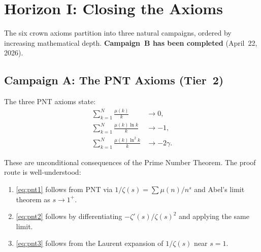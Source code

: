 \documentclass[11pt,a4paper]{article}
\begin{document}
\section{Horizon I: Closing the Axioms}
\label{sec:axioms}

The six crown axioms partition into three natural campaigns, ordered
by increasing mathematical depth. \textbf{Campaign~B has been completed}
(April~22, 2026).

\subsection{Campaign A: The PNT Axioms (Tier~2)}

\begin{axiombox}
\label{ax:pnt}
The three PNT axioms state:
\begin{align}
  \sum_{k=1}^{N} \frac{\mu(k)}{k} &\to 0, \label{eq:pnt1} \\
  \sum_{k=1}^{N} \frac{\mu(k)\ln k}{k} &\to -1, \label{eq:pnt2} \\
  \sum_{k=1}^{N} \frac{\mu(k)\ln^2 k}{k} &\to -2\gamma. \label{eq:pnt3}
\end{align}
\end{axiombox}

These are unconditional consequences of the Prime Number Theorem.
The proof route is well-understood:

\begin{enumerate}
  \item \eqref{eq:pnt1} follows from PNT via
    $1/\zeta(s) = \sum \mu(n)/n^s$ and Abel's limit theorem as $s \to 1^+$.
  \item \eqref{eq:pnt2} follows by differentiating $-\zeta'(s)/\zeta(s)^2$
    and applying the same limit.
  \item \eqref{eq:pnt3} follows from the Laurent expansion of $1/\zeta(s)$
    near $s = 1$.
\end{enumerate}
\end{document}
